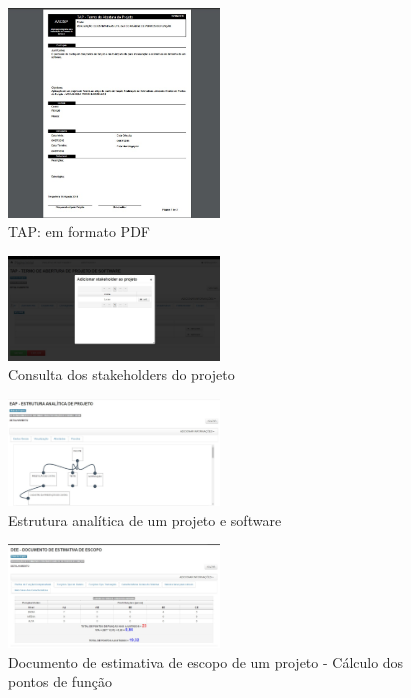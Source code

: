 \documentclass{acm_proc_article-sp}
\begin{document}
\begin{appendices}
\begin{figure}[h]
\centering %
\includegraphics[width=0.5\textwidth]{RF_Termo_de_Abertura_de_projeto_em_PDF.jpg} %
\caption{TAP: em formato PDF}
\end{figure}


\begin{figure}[h]
\centering %
\includegraphics[width=0.5\textwidth]{RF_TAPDetalhamento_stakeholder.jpg} %
\caption{Consulta dos stakeholders do projeto}
\end{figure}

\begin{figure}[h]
\centering %
\includegraphics[width=0.5\textwidth]{RF_Eap_do_projeto_de_software.jpg} %
\caption{Estrutura analítica de um projeto e software}
\end{figure}

\begin{figure}[h]
\centering %
\includegraphics[width=0.5\textwidth]{RF_documento_de_estimativa_de_escopo.jpg} %
\caption{Documento de estimativa de escopo de um projeto - Cálculo dos pontos de função}
\end{figure}


\end{appendices}
\end{document}
